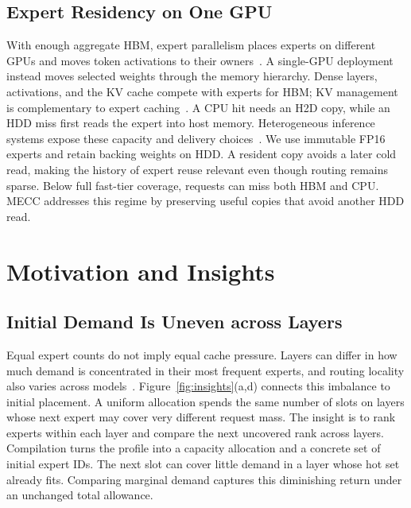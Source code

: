 \documentclass[conference,9pt,letterpaper]{IEEEtran}
\begin{document}
\subsection{Expert Residency on One GPU}
With enough aggregate HBM, expert parallelism places experts on different GPUs and moves token activations to their owners~\cite{deepspeedmoe,tutel,megablocks,flashmoedist,harmoeny}. A single-GPU deployment instead moves selected weights through the memory hierarchy. Dense layers, activations, and the KV cache compete with experts for HBM; KV management is complementary to expert caching~\cite{pagedattention,sglang}. A CPU hit needs an H2D copy, while an HDD miss first reads the expert into host memory. Heterogeneous inference systems expose these capacity and delivery choices~\cite{flexgen,dsinference,zeroinfinity,llmflash,powerinfer}. We use immutable FP16 experts and retain backing weights on HDD. A resident copy avoids a later cold read, making the history of expert reuse relevant even though routing remains sparse. Below full fast-tier coverage, requests can miss both HBM and CPU. MECC addresses this regime by preserving useful copies that avoid another HDD read.

\section{Motivation and Insights}
\label{sec:challenges}
\subsection{Initial Demand Is Uneven across Layers}
Equal expert counts do not imply equal cache pressure. Layers can differ in how much demand is concentrated in their most frequent experts, and routing locality also varies across models~\cite{routingconsistency}. Figure~\ref{fig:insights}(a,d) connects this imbalance to initial placement. A uniform allocation spends the same number of slots on layers whose next expert may cover very different request mass. The insight is to rank experts within each layer and compare the next uncovered rank across layers. Compilation turns the profile into a capacity allocation and a concrete set of initial expert IDs. The next slot can cover little demand in a layer whose hot set already fits. Comparing marginal demand captures this diminishing return under an unchanged total allowance.
\end{document}
